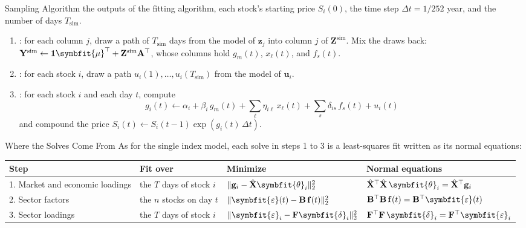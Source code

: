 \documentclass[aspectratio=169,11pt]{beamer}
\begin{document}
\begin{frame}{Sampling Algorithm}
  \textbf{} the outputs of the fitting algorithm, each stock's starting price
  $S_{i}(0)$, the time step $\Delta t=1/252$ year, and the number of days $T_{\text{sim}}$.
  \begin{enumerate}\setlength{\itemsep}{0.4em}
    \item {}: for each column $j$, draw a path of $T_{\text{sim}}$ days from the
      model of $\mathbf{z}_{j}$ into column $j$ of $\mathbf{Z}^{\text{sim}}$. Mix the draws back:
      $\mathbf{Y}^{\text{sim}}\gets\mathbf{1}\symbfit{\mu}^{\top}+\mathbf{Z}^{\text{sim}}\mathbf{A}^{\top}$,
      whose columns hold $g_{m}(t)$, $x_{\ell}(t)$, and $f_{s}(t)$.
    \item {}: for each stock $i$, draw a path
      $u_{i}(1),\dots,u_{i}(T_{\text{sim}})$ from the model of $\mathbf{u}_{i}$.
    \item {}: for each stock $i$ and each day $t$, compute
      \begin{equation*}
        g_{i}(t)\gets\alpha_{i}+\beta_{i}\,g_{m}(t)+\sum_{\ell}\eta_{i\ell}\,x_{\ell}(t)+\sum_{s}\delta_{is}\,f_{s}(t)+u_{i}(t)
      \end{equation*}
      and compound the price $S_{i}(t)\gets S_{i}(t-1)\exp\left(g_{i}(t)\,\Delta t\right)$.
  \end{enumerate}
\end{frame}

\begin{frame}{Where the Solves Come From}
  As for the single index model, each solve in steps 1 to 3 is a least-squares fit written as its
  normal equations:
  \begin{center}\footnotesize\setlength{\tabcolsep}{4pt}
  \begin{tabular}{llll}
    \textbf{Step} & \textbf{Fit over} & \textbf{Minimize} & \textbf{Normal equations}\\ \hline
    1. Market and economic loadings & the $T$ days of stock $i$ & $\lVert\mathbf{g}_{i}-\hat{\mathbf{X}}\symbfit{\theta}_{i}\rVert_{2}^{2}$ & $\hat{\mathbf{X}}^{\top}\hat{\mathbf{X}}\,\symbfit{\theta}_{i}=\hat{\mathbf{X}}^{\top}\mathbf{g}_{i}$\\
    2. Sector factors & the $n$ stocks on day $t$ & $\lVert\symbfit{\varepsilon}(t)-\mathbf{B}\,\mathbf{f}(t)\rVert_{2}^{2}$ & $\mathbf{B}^{\top}\mathbf{B}\,\mathbf{f}(t)=\mathbf{B}^{\top}\symbfit{\varepsilon}(t)$\\
    3. Sector loadings & the $T$ days of stock $i$ & $\lVert\symbfit{\varepsilon}_{i}-\mathbf{F}\symbfit{\delta}_{i}\rVert_{2}^{2}$ & $\mathbf{F}^{\top}\mathbf{F}\,\symbfit{\delta}_{i}=\mathbf{F}^{\top}\symbfit{\varepsilon}_{i}$\\
  \end{tabular}
  \end{center}
\end{frame}
\end{document}
